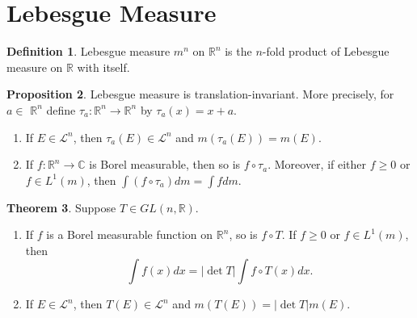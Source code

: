 \documentclass[12pt,a4paper]{book}
\newcommand{\blue}[1]{\textcolor{blue}{#1}}
\newenvironment{enu}{\begin{enumerate}[(1)]}{\end{enumerate}}
\theoremstyle{definition}
\newtheorem{defn}{Definition}[section]
\newtheorem{theo}[defn]{Theorem}
\newtheorem{prop}[defn]{Proposition}
\begin{document}
\section{Lebesgue Measure}
\begin{defn}
    Lebesgue measure $m^n$ on $\mathbb{R}^n$ is the $n$-fold product of Lebesgue measure on $\mathbb{R}$ with itself.

\end{defn}
\begin{prop}
    Lebesgue measure is translation-invariant. More precisely, for $a \in$ $\mathbb{R}^n$ define $\tau_a: \mathbb{R}^n \rightarrow \mathbb{R}^n$ by $\tau_a(x)=x+a$.
    \begin{enu}
        \item If $E \in \mathcal{L}^n$, then $\tau_a(E) \in \mathcal{L}^n$ and $m\left(\tau_a(E)\right)=m(E)$.
        \item If $f: \mathbb{R}^n \rightarrow \mathbb{C}$ is Borel
        measurable, then so is $f \circ \tau_a$. Moreover, if either $f \geq 0$ or $f \in L^1(m)$, then $\int\left(f \circ \tau_a\right) d m=\int f d m$.
    \end{enu}
\end{prop}
\begin{theo}
    Suppose $T \in G L(n, \mathbb{R})$.
    \begin{enu}
        \item If $f$ is a Borel measurable function on $\mathbb{R}^n$, so is $f \circ T$. If $f \geq 0$ or $f \in L^1(m)$, then
        $$
            \int f(x) d x=|\operatorname{det} T| \int f \circ T(x) d x .
        $$
        \item If $E \in \mathcal{L}^n$, then $T(E) \in \mathcal{L}^n$ and $m(T(E))=|\operatorname{det} T| m(E)$.
    \end{enu}
\end{theo}
\end{document}
